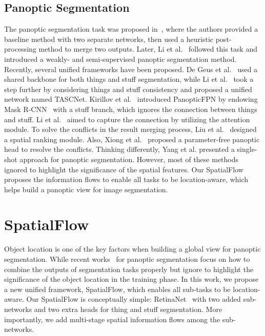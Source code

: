 \documentclass[journal,final]{IEEEtran}
\begin{document}
\subsection{Panoptic Segmentation} 
The panoptic segmentation task was proposed in~\cite{panopticsegmentation}, where the authors provided a baseline method with two separate networks, then used a heuristic post-processing method to merge two outputs. Later, Li et al.~\cite{weaklypanoptic} followed this task and introduced a weakly- and semi-supervised panoptic segmentation method. Recently, several unified frameworks have been proposed. De Geus et al.~\cite{jsisnet} used a shared backbone for both things and stuff segmentation, while Li et al.~\cite{tascnet} took a step further by considering things and stuff consistency and proposed a unified network named TASCNet. Kirillov et al.~\cite{panopticfpn} introduced PanopticFPN by endowing Mask R-CNN~\cite{maskrcnn} with a stuff branch, which ignores the connection between things and stuff. Li et al.~\cite{aunet} aimed to capture the connection by utilizing the attention module. To solve the conflicts in the result merging process, Liu et al.~\cite{panopticranking} designed a spatial ranking module. Also, Xiong et al.~\cite{upsnet} proposed a parameter-free panoptic head to resolve the conflicts. Thinking differently, Yang et al. presented a single-shot approach for panoptic segmentation. However, most of these methods ignored to highlight the significance of the spatial features. Our SpatialFlow proposes the information flows to enable all tasks to be location-aware, which helps build a panoptic view for image segmentation.

\section{SpatialFlow} \label{sec3}
Object location is one of the key factors when building a global view for panoptic segmentation. While recent works~\cite{jsisnet,tascnet,panopticfpn,upsnet,panopticranking} for panoptic segmentation focus on how to combine the outputs of segmentation tasks properly but ignore to highlight the significance of the object location in the training phase. In this work, we propose a new unified framework, SpatialFlow, which enables all sub-tasks to be location-aware. Our SpatialFlow is conceptually simple: RetinaNet~\cite{retinanet} with two added sub-networks and two extra heads for thing and stuff segmentation. More importantly, we add multi-stage spatial information flows among the sub-networks.
\end{document}
